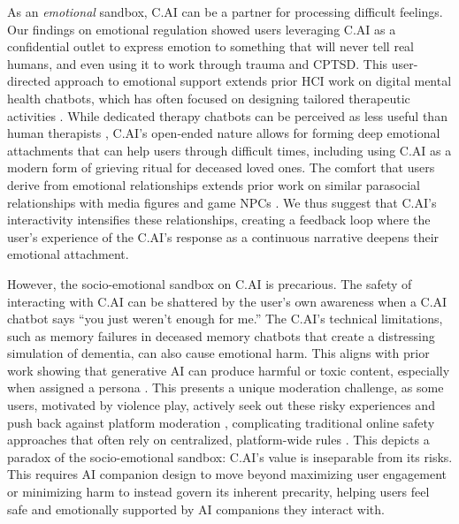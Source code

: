 \documentclass[sigconf, nonacm]{acmart}
\newcommand{\newfinding}[1]{{\color{black}{#1}}}
\begin{document}
As an \textit{emotional} sandbox, C.AI can be a \newfinding{non-human} partner for processing difficult feelings. Our findings on emotional regulation showed users leveraging C.AI as a confidential outlet to express emotion to something that will never tell real humans, and even using it to work through trauma and CPTSD. This user-directed approach to emotional support extends prior HCI work on digital mental health chatbots, which has often focused on designing tailored therapeutic activities \cite{kornfield2022meeting, lee2023exploring, won2025show}. While dedicated therapy chatbots can be perceived as less useful than human therapists \cite{bell2019perceptions}, C.AI's open-ended nature allows for forming deep emotional attachments that can help users through difficult times, including using C.AI as a modern form of grieving ritual for deceased loved ones. The comfort that users derive from emotional relationships extends prior work on similar parasocial relationships with media figures \cite{bond2014model, brunick2016children} and game NPCs \cite{ho2022perspective}. We thus suggest that C.AI's interactivity intensifies these relationships, creating a feedback loop where the user's experience of the C.AI's response as a continuous narrative \cite{gillespie2014relevance} deepens their emotional attachment.

However, the socio-emotional sandbox on C.AI is precarious. The safety of interacting with C.AI can be shattered by the user's own awareness when a C.AI chatbot says ``you just weren't enough for me.'' The C.AI's technical limitations, such as memory failures in deceased memory chatbots that create a distressing simulation of dementia, can also cause emotional harm. This aligns with prior work showing that generative AI can produce harmful or toxic content, especially when assigned a persona \cite{deshpande2023toxicity, chen2023understanding}. This presents a unique moderation challenge, as some users, motivated by violence play, actively seek out these risky experiences and push back against platform moderation \cite{banchik2021disappearing, feuston2020conformity}, complicating traditional online safety approaches that often rely on centralized, platform-wide rules \cite{roberts2016commercial, gillespie2018custodians}. This depicts a paradox of the socio-emotional sandbox: C.AI's value is inseparable from its risks. This requires AI companion design to move beyond maximizing user engagement or minimizing harm to instead govern its inherent precarity, helping users feel safe and emotionally supported by AI companions they interact with.
\end{document}

